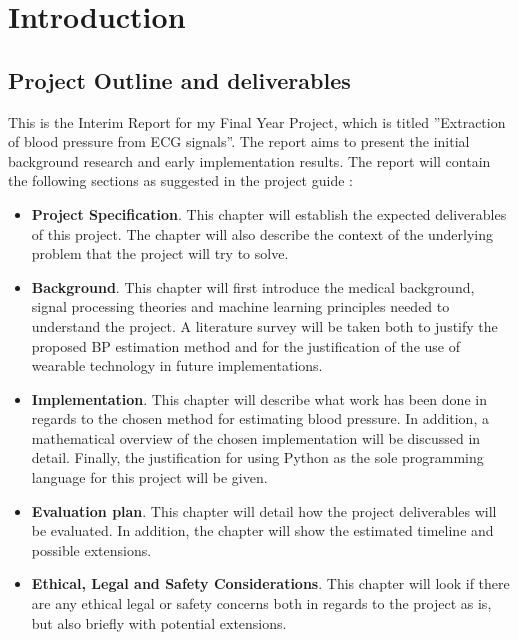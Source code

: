 \documentclass[11pt, a4paper]{article}
\begin{document}
\newcommand{\HRule}{\rule{\linewidth}{0.5mm}}

\newpage


\tableofcontents
\newpage
{}
\newpage

\section{Introduction}
\subsection{Project Outline and deliverables}
This is the Interim Report for my Final Year Project, which is titled ”Extraction of blood pressure from ECG signals”. The report aims to present the initial background research and early implementation results. The report will contain the following sections as suggested in the project guide \cite{FYP2022}:\begin{itemize}
    \item \textbf{Project Specification}. This chapter will establish the expected deliverables of this project. The chapter will also describe the context of the underlying problem that the project will try to solve.
    \item \textbf{Background}. This chapter will first introduce the medical background, signal processing theories and machine learning principles needed to understand the project. A literature survey will be taken both to justify the proposed BP estimation method and for the justification of the use of wearable technology in future implementations.
    \item  \textbf{Implementation}. This chapter will describe what work has been done in regards to the chosen method for estimating blood pressure. In addition, a mathematical overview of the chosen implementation will be discussed in detail. Finally, the justification for using Python as the sole programming language for this project will be given.
    \item \textbf{Evaluation plan}. This chapter will detail how the project deliverables will be evaluated. In addition, the chapter will show the estimated timeline and possible extensions.
    \item \textbf{Ethical, Legal and Safety Considerations}. This chapter will
    look if there are any ethical legal or safety concerns both in regards to the project as is, but also briefly with potential extensions.
\end{itemize}
\end{document}
